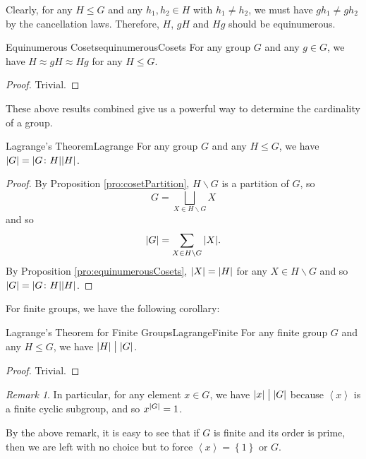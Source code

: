 \documentclass[math]{amznotes}
\theoremstyle{remark}
\newtheorem*{remark}{Remark}
\newcommand{\0}{\mathbf{0}}
\newcommand{\1}{\mathbf{1}}
\begin{document}
Clearly, for any $H \leq G$ and any $h_1, h_2 \in H$ with $h_1 \neq h_2$, we must have $gh_1 \neq gh_2$ by the cancellation laws. Therefore, $H$, $gH$ and $Hg$ should be equinumerous.
\begin{probox}{Equinumerous Cosets}{equinumerousCosets}
    For any group $G$ and any $g \in G$, we have $H \approx gH \approx Hg$ for any $H \leq G$.
    \tcblower
    \begin{proof}
        Trivial.
    \end{proof}
\end{probox}
These above results combined give us a powerful way to determine the cardinality of a group.
\begin{thmbox}{Lagrange's Theorem}{Lagrange}
    For any group $G$ and any $H \leq G$, we have ${\left\lvert {G} \right\rvert} = {\left\lvert {G \colon H} \right\rvert}{\left\lvert {H} \right\rvert}$.
    \tcblower
    \begin{proof}
        By Proposition \ref{pro:cosetPartition}, $H \backslash G$ is a partition of $G$, so 
        \begin{equation*}
            G = \bigsqcup_{X \in H \backslash G} X
        \end{equation*}
        and so 
        \begin{equation*}
            {\left\lvert {G} \right\rvert} = \sum_{X \in H \backslash G} {\left\lvert {X} \right\rvert}.
        \end{equation*}
        By Proposition \ref{pro:equinumerousCosets}, ${\left\lvert {X} \right\rvert} = {\left\lvert {H} \right\rvert}$ for any $X \in H \backslash G$ and so ${\left\lvert {G} \right\rvert} = {\left\lvert {G \colon H} \right\rvert}{\left\lvert {H} \right\rvert}$.
    \end{proof}
\end{thmbox}
For finite groups, we have the following corollary:
\begin{corbox}{Lagrange's Theorem for Finite Groups}{LagrangeFinite}
    For any finite group $G$ and any $H \leq G$, we have ${\left\lvert {H} \right\rvert} \bigm\vert {\left\lvert {G} \right\rvert}$.
    \tcblower 
    \begin{proof}
        Trivial.
    \end{proof}
\end{corbox}
\begin{notebox}
    \begin{remark}
        In particular, for any element $x \in G$, we have ${\left\lvert {x} \right\rvert} \bigm\vert {\left\lvert {G} \right\rvert}$ because $\left\langle x \right\rangle$ is a finite cyclic subgroup, and so $x^{{\left\lvert {G} \right\rvert}} = 1$.
    \end{remark}
\end{notebox}
By the above remark, it is easy to see that if $G$ is finite and its order is prime, then we are left with no choice but to force $\left\langle x \right\rangle = \left\{1\right\}$ or $G$.
\end{document}
